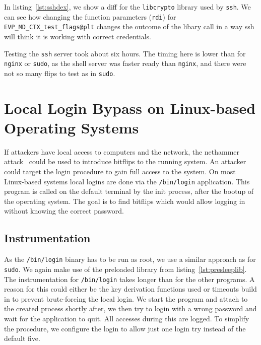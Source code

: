 In listing~\ref{lst:sshdex}, we show a diff for the \texttt{libcrypto} library
used by \texttt{ssh}. We can see how changing the function parameters
(\texttt{rdi}) for \texttt{EVP\_MD\_CTX\_test\_flags@plt} changes the outcome
of the libary call in a way ssh will think it is working with correct
credentials.

Testing the \texttt{ssh} server took about six hours. The timing here is lower
than for \texttt{nginx} or \texttt{sudo}, as the shell server was faster ready
than \texttt{nginx}, and there were not so many flips to test as in
\texttt{sudo}.

\section{Local Login Bypass on Linux-based Operating Systems}

If attackers have local access to computers and the network, the nethammer
attack~\cite{nethammer} could be used to introduce bitflips to the running
system. An attacker could target the login procedure to gain full access to the
system. On most Linux-based systems local logins are done via the
\texttt{/bin/login} application. This program is called on the default terminal
by the init process, after the bootup of the operating system. The goal is to
find bitflips which would allow logging in without knowing the correct password.

\subsection{Instrumentation}

As the \texttt{/bin/login} binary has to be run as root, we use a similar
approach as for \texttt{sudo}. We again make use of the preloaded library from
listing~\ref{lst:presleeplib}. The instrumentation for \texttt{/bin/login} takes
longer than for the other programs. A reason for this could either be the key
derivation functions used or timeouts build in to prevent brute-forcing the
local login. We start the program and attach to the created process shortly
after, we then try to login with a wrong password and wait for the application
to quit. All accesses during this are logged. To simplify the procedure, we
configure the login to allow just one login try instead of the default five.

